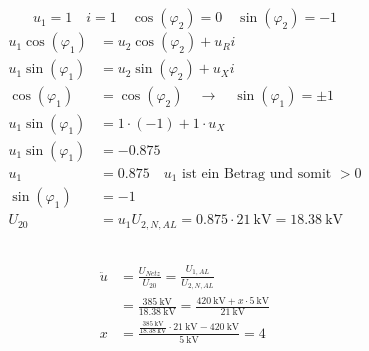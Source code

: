 \documentclass[11pt,a4paper]{scrartcl}
\newcommand{\mybr}[1]{\left(#1\right)}
\newcommand{\0}{_{\mybr{0}}}
\newcommand{\1}{_{\mybr{1}}}
\newcommand{\2}{_{\mybr{2}}}
\newcommand{\USNA}{U_{2,N,AL}}
\newcommand{\ce}{\cos\mybr{\varphi_1}}
\newcommand{\se}{\sin\mybr{\varphi_1}}
\newcommand{\cz}{\cos\mybr{\varphi_2}}
\newcommand{\sz}{\sin\mybr{\varphi_2}}
\begin{document}
\subsection{}
\begin{equation}
u_1=1\quad i=1\quad \cz=0\quad \sz=-1
\end{equation}
\begin{align}
u_1\ce&=u_2\cz+u_R i\\
u_1\se&=u_2\sz+u_X i\\
\ce&=\cz\quad \rightarrow\quad \se = \pm 1\\
u_1\se&=1\cdot\mybr{-1}+1\cdot u_X\\
u_1\se&=\num{-0.875}\\
u_1&=\num{0.875}\quad\text{$u_1$ ist ein Betrag und somit $>0$}\\
\se&=\num{-1}\\
U_{20}&=u_1\USNA=\num{0.875}\cdot\SI{21}{\kilo\volt}=\SI{18.38}{\kilo\volt}
\end{align}

\subsection{}
\begin{align}
\ddot{u}&=\frac{U_{Netz}}{U_{20}}=\frac{U_{1,AL}}{\USNA}\\
&=\frac{\SI{385}{\kilo\volt}}{\SI{18.38}{\kilo\volt}}=\frac{\SI{420}{\kilo\volt}+x\cdot\SI{5}{\kilo\volt}}{\SI{21}{\kilo\volt}}\\
x&=\frac{\frac{\SI{385}{\kilo\volt}}{\SI{18.38}{\kilo\volt}}\cdot\SI{21}{\kilo\volt}-\SI{420}{\kilo\volt}}{\SI{5}{\kilo\volt}}=4
\end{align}

\section{}
\end{document}
